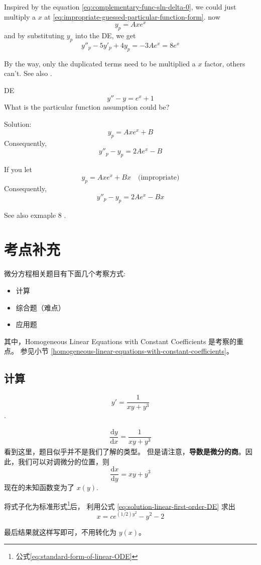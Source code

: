 Inspired by the equation \ref{eq:complementary-func-sln-delta-0}, 
we could just multiply a $x$ at \ref{eq:impropriate-guessed-particular-function-form}.
now
\[
    y_p = Ax e^x
\]
and by substituting $y_p$ into the DE, we get
\[
    y''_p - 5 y'_p + 4y_p = -3A e^x = 8e^x
\]

By the way, only the duplicated terms need to be multiplied a $x$ factor,
others can't. See also \cite[page 145, pdf 156, example 3]{we}.
\begin{example}
    DE
    \[
        y'' - y = e^x + 1
    \]
    What is the particular function assumption could be? 

    Solution:
    \[
        y_p = Axe^x + B
    \]
    Consequently,
    \[
        y''_p - y_p = 2Ae^x - B
    \]

    If you let
    \[
        y_p = Axe^x + Bx\quad \mbox{(impropriate)}
    \]
    Consequently,
    \[
        y''_p - y_p = 2Ae^x - Bx
    \]
\end{example}

See also exmaple 8 \cite[page 148]{fcde}.

\section{考点补充}

微分方程相关题目有下面几个考察方式:
\begin{itemize}
    \item 计算 
    \item 综合题（难点）
    \item 应用题
\end{itemize}

其中，Homogeneous Linear Equations with Constant Coefficients 是考察的重点。
参见小节 \ref{homogeneous-linear-equations-with-constant-coefficients}。

\subsection{计算}

\begin{example}
    \[
        y' = \dfrac{1}{xy + y^3}
    \]
    \cite[page 143, pdf 154]{we}.

    \begin{align*}
        \dfrac{\mathrm{d}y}{\mathrm{d}x} = \dfrac{1}{xy + y^3}
    \end{align*}
    看到这里，题目似乎并不是我们了解的类型。
    但是请注意，\textbf{导数是微分的商}。因此，我们可以对调微分的位置，则
    \[
        \dfrac{\mathrm{d}x}{\mathrm{d}y} = {xy + y^3}
    \]
    现在的未知函数变为了 $x(y)$. 

    将式子化为标准形式\footnote{公式\ref{eq:standard-form-of-linear-ODE}}后，
    利用公式 \ref{eq:solution-linear-first-order-DE} 求出
    \[
        x = c e^{(1/2) y^2} - y^2 - 2
    \]

    最后结果就这样写即可，不用转化为 $y(x)$。
\end{example}

